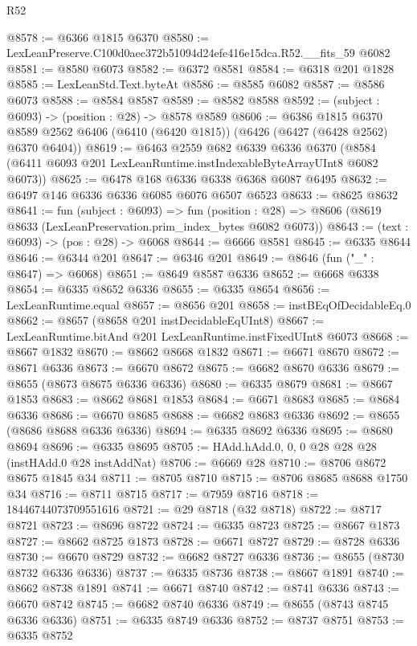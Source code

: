 \begin{lexlean}{R52}
\begin{coremodule}
@8578 := @6366 @1815 @6370
@8580 := LexLeanPreserve.C100d0aec372b51094d24efe416e15dca.R52.__fits_59 @6082
@8581 := @8580 @6073
@8582 := @6372 @8581
@8584 := @6318 @201 @1828
@8585 := LexLeanStd.Text.byteAt
@8586 := @8585 @6082
@8587 := @8586 @6073
@8588 := @8584 @8587
@8589 := @8582 @8588
@8592 := (subject : @6093) -> (position : @28) -> @8578 @8589
@8606 := @6386
    @1815
    @6370
    @8589
    @2562
    @6406
    (@6410 (@6420 @1815))
    (@6426 (@6427 (@6428 @2562) @6370 @6404))
@8619 := @6463
    @2559
    @682
    @6339
    @6336
    @6370
    (@8584 (@6411 @6093 @201 LexLeanRuntime.instIndexableByteArrayUInt8 @6082 @6073))
@8625 := @6478 @168 @6336 @6338 @6368 @6087 @6495
@8632 := @6497 @146 @6336 @6336 @6085 @6076 @6507 @6523
@8633 := @8625 @8632
@8641 := fun (subject : @6093) =>
  fun (position : @28) => @8606 (@8619 @8633 (LexLeanPreservation.prim_index_bytes @6082 @6073))
@8643 := (text : @6093) -> (pos : @28) -> @6068
@8644 := @6666 @8581
@8645 := @6335 @8644
@8646 := @6344 @201
@8647 := @6346 @201
@8649 := @8646 (fun ("_" : @8647) => @6068)
@8651 := @8649 @8587 @6336
@8652 := @6668 @6338
@8654 := @6335 @8652 @6336
@8655 := @6335 @8654
@8656 := LexLeanRuntime.equal
@8657 := @8656 @201
@8658 := instBEqOfDecidableEq.{0}
@8662 := @8657 (@8658 @201 instDecidableEqUInt8)
@8667 := LexLeanRuntime.bitAnd @201 LexLeanRuntime.instFixedUInt8 @6073
@8668 := @8667 @1832
@8670 := @8662 @8668 @1832
@8671 := @6671 @8670
@8672 := @8671 @6336
@8673 := @6670 @8672
@8675 := @6682 @8670 @6336
@8679 := @8655 (@8673 @8675 @6336 @6336)
@8680 := @6335 @8679
@8681 := @8667 @1853
@8683 := @8662 @8681 @1853
@8684 := @6671 @8683
@8685 := @8684 @6336
@8686 := @6670 @8685
@8688 := @6682 @8683 @6336
@8692 := @8655 (@8686 @8688 @6336 @6336)
@8694 := @6335 @8692 @6336
@8695 := @8680 @8694
@8696 := @6335 @8695
@8705 := HAdd.hAdd.{0, 0, 0} @28 @28 @28 (instHAdd.{0} @28 instAddNat)
@8706 := @6669 @28
@8710 := @8706 @8672 @8675 @1845 @34
@8711 := @8705 @8710
@8715 := @8706 @8685 @8688 @1750 @34
@8716 := @8711 @8715
@8717 := @7959 @8716
@8718 := 18446744073709551616
@8721 := @29 @8718 (@32 @8718)
@8722 := @8717 @8721
@8723 := @8696 @8722
@8724 := @6335 @8723
@8725 := @8667 @1873
@8727 := @8662 @8725 @1873
@8728 := @6671 @8727
@8729 := @8728 @6336
@8730 := @6670 @8729
@8732 := @6682 @8727 @6336
@8736 := @8655 (@8730 @8732 @6336 @6336)
@8737 := @6335 @8736
@8738 := @8667 @1891
@8740 := @8662 @8738 @1891
@8741 := @6671 @8740
@8742 := @8741 @6336
@8743 := @6670 @8742
@8745 := @6682 @8740 @6336
@8749 := @8655 (@8743 @8745 @6336 @6336)
@8751 := @6335 @8749 @6336
@8752 := @8737 @8751
@8753 := @6335 @8752

\end{coremodule}
\end{lexlean}
